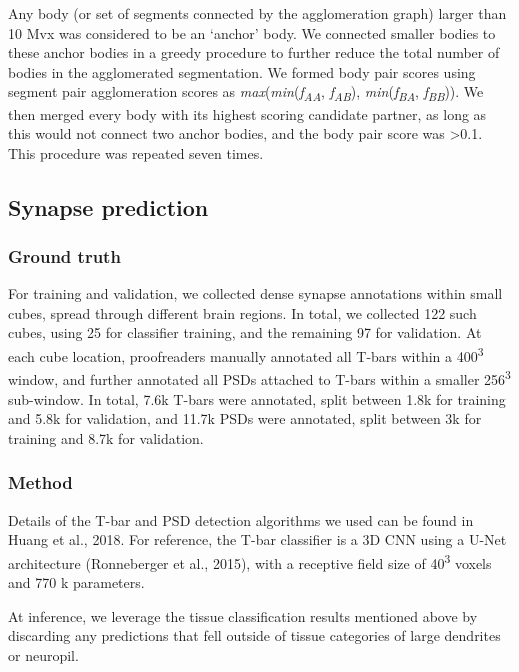\documentclass{article}
\begin{document}
Any body (or set of segments connected by the agglomeration graph) larger than 10 Mvx was considered to be an ‘anchor’ body. We connected smaller bodies to these anchor bodies in a greedy procedure to further reduce the total number of bodies in the agglomerated segmentation. We formed body pair scores using segment pair agglomeration scores as \emph{max}(\emph{min}(\emph{f}\emph{\textsubscript{AA}}, \emph{f}\emph{\textsubscript{AB}}), \emph{min}(\emph{f}\emph{\textsubscript{BA}}, \emph{f}\emph{\textsubscript{BB}})). We then merged every body with its highest scoring candidate partner, as long as this would not connect two anchor bodies, and the body pair score was >0.1. This procedure was repeated seven times.

\subsection*{Synapse prediction}

\subsubsection*{Ground truth}

For training and validation, we collected dense synapse annotations within small cubes, spread through different brain regions. In total, we collected 122 such cubes, using 25 for classifier training, and the remaining 97 for validation. At each cube location, proofreaders manually annotated all T-bars within a 400\textsuperscript{3} window, and further annotated all PSDs attached to T-bars within a smaller 256\textsuperscript{3} sub-window. In total, 7.6k T-bars were annotated, split between 1.8k for training and 5.8k for validation, and 11.7k PSDs were annotated, split between 3k for training and 8.7k for validation.

\subsubsection*{Method}

Details of the T-bar and PSD detection algorithms we used can be found in Huang et al., 2018. For reference, the T-bar classifier is a 3D CNN using a U-Net architecture (Ronneberger et al., 2015), with a receptive field size of 40\textsuperscript{3} voxels and 770 k parameters.

At inference, we leverage the tissue classification results mentioned above by discarding any predictions that fell outside of tissue categories of large dendrites or neuropil.
\end{document}
